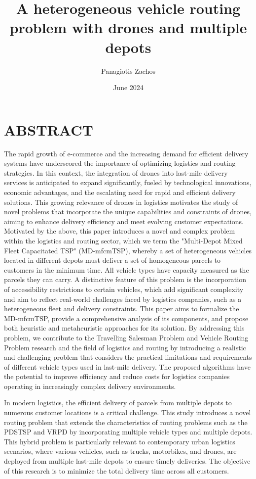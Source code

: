 \documentclass[twocolumn]{article}
\title{A heterogeneous vehicle routing problem with drones and multiple depots}
\author{Panagiotis Zachos}
\date{June 2024}
\begin{document}
	\maketitle
	
	\section*{ABSTRACT}
	The rapid growth of e-commerce and the increasing demand for efficient delivery systems have underscored the importance of optimizing logistics and routing strategies. In this context, the integration of drones into last-mile delivery services is anticipated to expand significantly, fueled by technological innovations, economic advantages, and the escalating need for rapid and efficient delivery solutions. This growing relevance of drones in logistics motivates the study of novel problems that incorporate the unique capabilities and constraints of drones, aiming to enhance delivery efficiency and meet evolving customer expectations. Motivated by the above, this paper introduces a novel and complex problem within the logistics and routing sector, which we term the "Multi-Depot Mixed Fleet Capacitated TSP" (MD-mfcmTSP), whereby a set of heterogeneous vehicles located in different depots must deliver a set of homogeneous parcels to customers in the minimum time. All vehicle types have capacity measured as the parcels they can carry. A distinctive feature of this problem is the incorporation of accessibility restrictions to certain vehicles, which add significant complexity and aim to reflect real-world challenges faced by logistics companies, such as a heterogeneous fleet and delivery constraints.
	This paper aims to formalize the MD-mfcmTSP, provide a comprehensive analysis of its components, and propose both heuristic and metaheuristic approaches for its solution. By addressing this problem, we contribute to the Travelling Salesman Problem and Vehicle Routing Problem research and the field of logistics and routing by introducing a realistic and challenging problem that considers the practical limitations and requirements of different vehicle types used in last-mile delivery. The proposed algorithms have the potential to improve efficiency and reduce costs for logistics companies operating in increasingly complex delivery environments.
	\par
	In modern logistics, the efficient delivery of parcels from multiple depots to numerous customer locations is a critical challenge. This study introduces a novel routing problem that extends the characteristics of routing problems such as the PDSTSP and VRPD by incorporating multiple vehicle types and multiple depots. This hybrid problem is particularly relevant to contemporary urban logistics scenarios, where various vehicles, such as trucks, motorbikes, and drones, are deployed from multiple last-mile depots to ensure timely deliveries. The objective of this research is to minimize the total delivery time across all customers.
	\par
	
\end{document}
